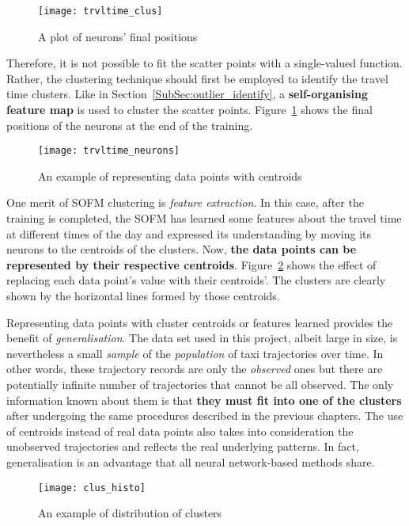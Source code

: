 \begin{figure}[h!]
\centering
\texttt{[image: trvltime\_clus]} 
\caption{A plot of neurons' final positions}\label{Fig:trvltime_clus}
\end{figure}

Therefore, it is not possible to fit the scatter points with a single-valued function. Rather, the clustering technique should first be employed to identify the travel time clusters. Like in Section~\ref{SubSec:outlier_identify}, a \textbf{self-organising feature map} is used to cluster the scatter points. Figure~\ref{Fig:trvltime_clus} shows the final positions of the neurons at the end of the training.

\begin{figure}[h!]
\texttt{[image: trvltime\_neurons]}
\centering
\caption{An example of representing data points with centroids}\label{Fig:trvltime_neurons}
\end{figure}

One merit of SOFM clustering is \emph{feature extraction}. In this case, after the training is completed, the SOFM has learned some features about the travel time at different times of the day and expressed its understanding by moving its neurons to the centroids of the clusters. Now, \textbf{the data points can be represented by their respective centroids}. Figure~\ref{Fig:trvltime_neurons} shows the effect of replacing each data point's value with their centroids'. The clusters are clearly shown by the horizontal lines formed by those centroids. 

Representing data points with cluster centroids or features learned provides the benefit of \emph{generalisation}. The data set used in this project, albeit large in size, is nevertheless a small \emph{sample} of the \emph{population} of taxi trajectories over time. In other words, these trajectory records are only the \emph{observed} ones but there are potentially infinite number of trajectories that cannot be all observed. The only information known about them is that \textbf{they must fit into one of the clusters} after undergoing the same procedures described in the previous chapters. The use of centroids instead of real data points also takes into consideration the unobserved trajectories and reflects the real underlying patterns. In fact, generalisation is an advantage that all neural network-based methods share. 

\begin{figure}[h!]
\texttt{[image: clus\_histo]}
\centering
\caption{An example of distribution of clusters}\label{Fig:clus_histo}
\end{figure}

